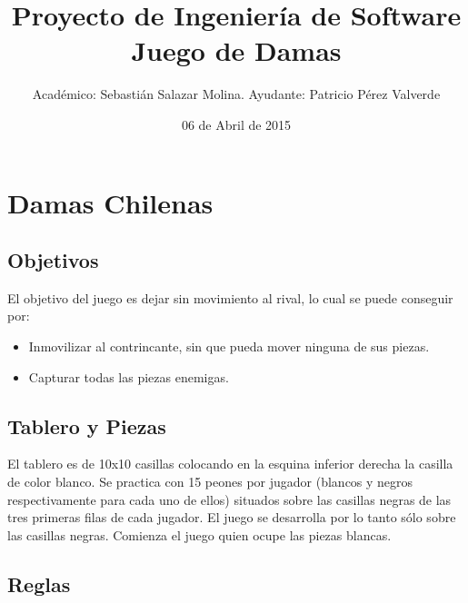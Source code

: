 \documentclass[a4paper,10pt]{article}
\title{Proyecto de Ingeniería de Software \newline Juego de Damas}
\author{\author{Académico: Sebastián Salazar Molina. \newline Ayudante: Patricio Pérez Valverde }}
\date{06 de Abril de 2015}
\begin{document}
\maketitle

\section{Damas Chilenas}

\subsection{Objetivos}
El objetivo del juego es dejar sin movimiento al rival, lo cual se puede conseguir por:
\begin{itemize}
 \item Inmovilizar al contrincante, sin que pueda mover ninguna de sus piezas.
 \item Capturar todas las piezas enemigas.
\end{itemize}

\subsection{Tablero y Piezas}

El tablero es de 10x10 casillas colocando en la esquina inferior derecha la casilla de color blanco. Se practica con 15 peones por jugador (blancos y negros respectivamente para cada uno de ellos) situados sobre las casillas negras de las tres primeras filas de cada jugador. El juego se desarrolla por lo tanto sólo sobre las casillas negras. Comienza el juego quien ocupe las piezas blancas.

\subsection{Reglas}
\end{document}
